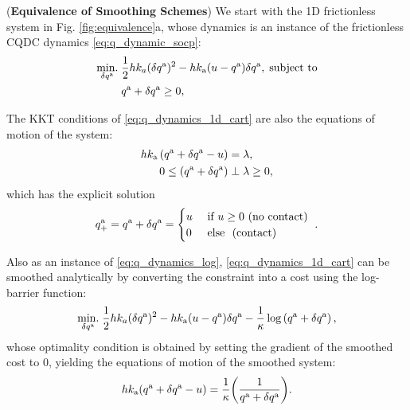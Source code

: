 \begin{example}\label{ex:equivalence} \normalfont(\textbf{Equivalence of Smoothing Schemes})
We start with the 1D frictionless system in Fig. \ref{fig:equivalence}a, whose dynamics is an instance of the frictionless CQDC dynamics \eqref{eq:q_dynamic_socp}:
\begin{equation}
\label{eq:q_dynamics_1d_cart}
\begin{aligned}
\underset{{\delta q^\mathrm{a}}}{\mathrm{min}.} \; &\frac{1}{2} hk_a ({\delta q^\mathrm{a}})^2 - h k_\mathrm{a} (u - {q^\mathrm{a}}) {\delta q^\mathrm{a}}, \; \text{subject to} \\
&{q^\mathrm{a}} + {\delta q^\mathrm{a}} \geq 0,
\end{aligned}
\end{equation}

The KKT conditions of \eqref{eq:q_dynamics_1d_cart} are also the equations of motion of the system:
\begin{subequations}
\label{eq:wallcartdynamics}
\begin{align} 
h k_\mathrm{a} \left({q^\mathrm{a}} + {\delta q^\mathrm{a}} - u\right) &= \lambda, \\
0 \leq \left({q^\mathrm{a}} + {\delta q^\mathrm{a}}  \right) &\perp \lambda \geq 0,
\end{align}
\end{subequations}
which has the explicit solution
\begin{equation}
    q^\mathrm{a}_+ = {q^\mathrm{a}} + {\delta q^\mathrm{a}} =  \begin{cases}
        u & \text{ if } u \geq 0  \text{ (no contact) }\\
        0 & \text{ else } \text{ (contact) }\\
    \end{cases}.
\end{equation}

Also as an instance of \eqref{eq:q_dynamics_log}, \eqref{eq:q_dynamics_1d_cart} can be smoothed analytically by converting the constraint into a cost using the log-barrier function:
\begin{equation}
\underset{{\delta q^\mathrm{a}}}{\mathrm{min}.} \; \frac{1}{2} hk_a ({\delta q^\mathrm{a}})^2 - h k_\mathrm{a} (u - {q^\mathrm{a}}) {\delta q^\mathrm{a}} - \frac{1}{\kappa} \log \left({q^\mathrm{a}} + {\delta q^\mathrm{a}} \right),    
\end{equation}
whose optimality condition is obtained by setting the gradient of the smoothed cost to 0, yielding the equations of motion of the smoothed system: 
\begin{equation}
\label{eq:smooth_1d_cart}
hk_\mathrm{a}({q^\mathrm{a}} + {\delta q^\mathrm{a}} - u) = \frac{1}{\kappa}\bigg(\frac{1}{{q^\mathrm{a}} + {\delta q^\mathrm{a}}}\bigg).
\end{equation}


\end{example}
